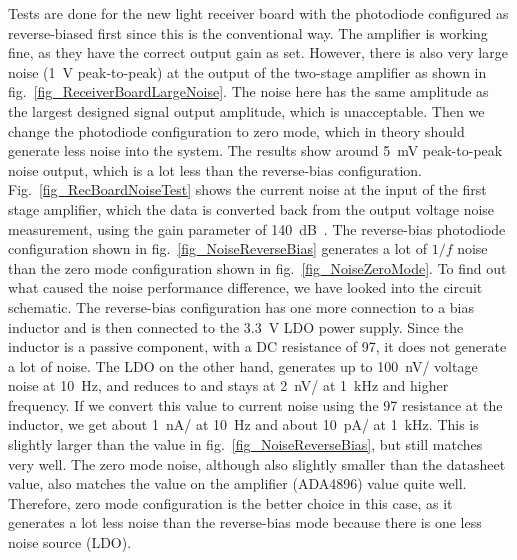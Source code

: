 Tests are done for the new light receiver board with the photodiode configured as reverse-biased first since this is the conventional way.  The amplifier is working fine, as they have the correct output gain as set.  However, there is also very large noise (\qty{1}{V} peak-to-peak) at the output of the two-stage amplifier as shown in fig.~\ref{fig_ReceiverBoardLargeNoise}.  The noise here has the same amplitude as the largest designed signal output amplitude, which is unacceptable.  Then we change the photodiode configuration to zero mode, which in theory should generate less noise into the system.  The results show around \qty{5}{mV} peak-to-peak noise output, which is a lot less than the reverse-bias configuration.  Fig.~\ref{fig_RecBoardNoiseTest} shows the current noise at the input of the first stage amplifier, which the data is converted back from the output voltage noise measurement, using the gain parameter of \qty{140}{dB\Omega}.  The reverse-bias photodiode configuration shown in fig.~\ref{fig_NoiseReverseBias} generates a lot of $1/f$ noise than the zero mode configuration shown in fig.~\ref{fig_NoiseZeroMode}.  To find out what caused the noise performance difference, we have looked into the circuit schematic.  The reverse-bias configuration has one more connection to a bias inductor and is then connected to the \qty{3.3}{V} LDO power supply.  Since the inductor is a passive component, with a DC resistance of \qty{97}{\Omega}, it does not generate a lot of noise.  The LDO on the other hand, generates up to \qty{100}{nV/\sqrthz} voltage noise at \qty{10}{Hz}, and reduces to and stays at \qty{2}{nV/\sqrthz} at \qty{1}{kHz} and higher frequency.  If we convert this value to current noise using the \qty{97}{\Omega} resistance at the inductor, we get about \qty{1}{nA/\sqrthz} at \qty{10}{Hz} and about \qty{10}{pA/\sqrthz} at \qty{1}{kHz}.  This is slightly larger than the value in fig.~\ref{fig_NoiseReverseBias}, but still matches very well.  The zero mode noise, although also slightly smaller than the datasheet value, also matches the value on the amplifier (ADA4896) value quite well.  Therefore, zero mode configuration is the better choice in this case, as it generates a lot less noise than the reverse-bias mode because there is one less noise source (LDO).


